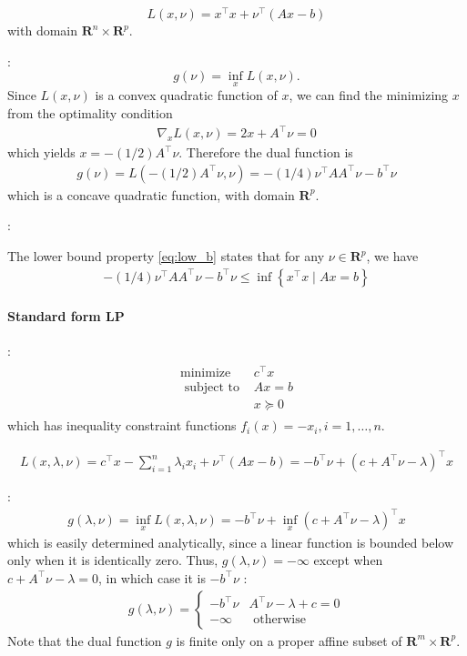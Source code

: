 \documentclass{article}
\begin{document}
$$L(x, \nu)=x^{\top} x+\nu^{\top}(A x-b)$$ with domain $\mathbf{R}^{n} \times \mathbf{R}^{p}$. 

:
$$g(\nu)=\inf _{x} L(x, \nu) .$$ Since $L(x, \nu)$ is a convex quadratic function of $x$, we can find the minimizing $x$ from the optimality condition
\begin{align*}
\nabla_{x} L(x, \nu)=2 x+A^{\top} \nu=0
\end{align*}
which yields $x=-(1 / 2) A^{\top} \nu .$ Therefore the dual function is
\begin{align*}
g(\nu)=L\left(-(1 / 2) A^{\top} \nu, \nu\right)=-(1 / 4) \nu^{\top} A A^{\top} \nu-b^{\top} \nu
\end{align*}
which is a concave quadratic function, with domain $\mathbf{R}^{p}$. 

:

The lower bound property \cref{eq:low_b} states that for any $\nu \in \mathbf{R}^{p}$, we have
\begin{align*}
-(1 / 4) \nu^{\top} A A^{\top} \nu-b^{\top} \nu \leq \inf \left\{x^{\top} x \mid A x=b\right\}
\end{align*}
\paragraph{Standard form LP}
:
\begin{align*}
\begin{array}{ll}
\operatorname{minimize} & c^{\top} x \\
\text { subject to } & A x=b \\
& x \succeq 0
\end{array}
\end{align*}
which has inequality constraint functions $f_{i}(x)=-x_{i}, i=1, \ldots, n .$

\begin{align*}
L(x, \lambda, \nu)=c^{\top} x-\sum_{i=1}^{n} \lambda_{i} x_{i}+\nu^{\top}(A x-b)=-b^{\top} \nu+\left(c+A^{\top} \nu-\lambda\right)^{\top} x
\end{align*}

:
\begin{align}
g(\lambda, \nu)=\inf _{x} L(x, \lambda, \nu)=-b^{\top} \nu+\inf _{x}\left(c+A^{\top} \nu-\lambda\right)^{\top} x \label{eq:uaue}
\end{align}
which is easily determined analytically, since a linear function is bounded below only when it is identically zero. Thus, $g(\lambda, \nu)=-\infty$ except when $c+A^{\top} \nu-\lambda=0$, in which case it is $-b^{\top} \nu$ :
\begin{align*}
g(\lambda, \nu)= \begin{cases}-b^{\top} \nu & A^{\top} \nu-\lambda+c=0 \\ -\infty & \text { otherwise }\end{cases}
\end{align*}
Note that the dual function $g$ is finite only on a proper affine subset of $\mathbf{R}^{m} \times \mathbf{R}^{p}$. 
\end{document}
